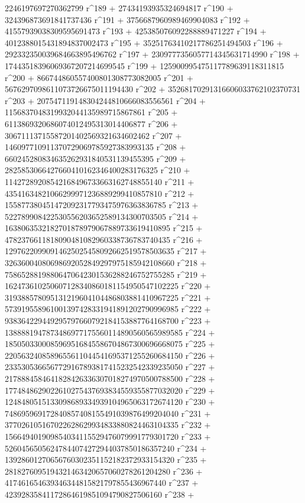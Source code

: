        2246197697270362799 r^189 + 27434193935324694817 r^190 + 
       324396873691841737436 r^191 + 3756687960989469904083 r^192 + 
       41557939038309595691473 r^193 + 
       425385076092288889471227 r^194 + 
       4012388015431894837002473 r^195 + 
       35251763410217786251494503 r^196 + 
       292332350039684663895496762 r^197 + 
       2309777356057714345631714990 r^198 + 
       17443518396069367207214699545 r^199 + 
       125900995475117789639118311815 r^200 + 
       866744860557400801308773082005 r^201 + 
       5676297098611073726675011194430 r^202 + 
       35268170291316606033762102370731 r^203 + 
       207547119148304244810666083556561 r^204 + 
       1156837048319932044135989715867861 r^205 + 
       6113869320686074012495313014406877 r^206 + 
       30671113715587201402569321634602462 r^207 + 
       146097710911370729069785927383993135 r^208 + 
       660245280834635262931840531139455395 r^209 + 
       2825853066427660410162346400283176325 r^210 + 
       11427289208542168496733663162748855140 r^211 + 
       43541634821066299971236889299410857810 r^212 + 
       155877380451472092317793475976363836785 r^213 + 
       522789908422530556203652589134300703505 r^214 + 
       1638063532182701878979067889733619410895 r^215 + 
       4782376611818090481082960338736783740435 r^216 + 
       12976220990914625025458092662519578503635 r^217 + 
       32636004080698692052849297975185942108660 r^218 + 
       75865288198806470642301536288246752755285 r^219 + 
       162473610250607128340860181154950547102225 r^220 + 
       319388578095131219604104486803881410967225 r^221 + 
       573919558961001397428331941891202790996985 r^222 + 
       938364229449295797660792184153887764168700 r^223 + 
       1388881947873486977175560114890560565989585 r^224 + 
       1850503300085969516845586704867300696668075 r^225 + 
       2205632408589655611044541695371255260684150 r^226 + 
       2335305366567729167893817415232542339235050 r^227 + 
       2178884584641828426336307018274970500788500 r^228 + 
       1774848629022610275437693834559355877032020 r^229 + 
       1248480515133098689334939104965063172674120 r^230 + 
       748695969172840857408155491039876499204040 r^231 + 
       377026105167022628629934833880824463104335 r^232 + 
       156649401909854034115529476079991779301720 r^233 + 
       52604565056247844074272944037850186357240 r^234 + 
       13928601270656760302351152182372933154320 r^235 + 
       2818276095194321463420657060278261204280 r^236 + 
       417461654639346344815821797855436967440 r^237 + 
       42392835841172864619851094790827506160 r^238 + 
